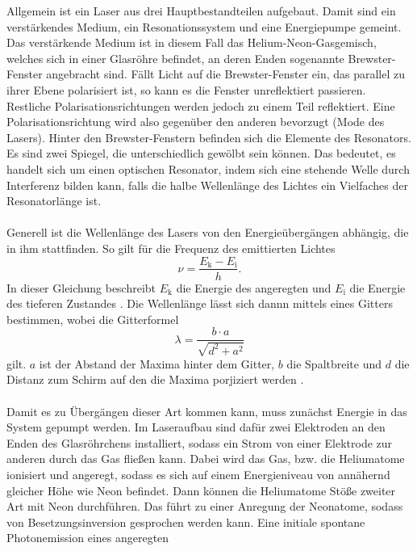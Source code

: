 Allgemein ist ein Laser aus drei Hauptbestandteilen aufgebaut. Damit sind ein 
verstärkendes Medium, ein Resonationssystem und eine Energiepumpe gemeint.
Das verstärkende Medium ist in diesem Fall das Helium-Neon-Gasgemisch, welches sich 
in einer Glasröhre befindet, an deren Enden sogenannte Brewster-Fenster angebracht sind.
Fällt Licht auf die Brewster-Fenster ein, das parallel zu ihrer Ebene polarisiert ist,
so kann es die Fenster unreflektiert passieren. Restliche Polarisationsrichtungen werden jedoch
zu einem Teil reflektiert. Eine Polarisationsrichtung wird also gegenüber den anderen 
bevorzugt (Mode des Lasers). Hinter den Brewster-Fenstern befinden sich die 
Elemente des Resonators. Es sind zwei Spiegel, die unterschiedlich gewölbt sein können.
Das bedeutet, es handelt sich um einen optischen Resonator, indem sich eine 
stehende Welle durch Interferenz bilden kann, falls die halbe Wellenlänge des Lichtes ein 
Vielfaches der Resonatorlänge ist.\\\\
Generell ist die Wellenlänge des Lasers von den Energieübergängen abhängig, die in ihm 
stattfinden. So gilt für die Frequenz des emittierten Lichtes 
\begin{equation}
    \nu = \frac{ E_{\text{k}} - E_{\text{i}} }{h}.
    \label{eq1}
\end{equation}
In dieser Gleichung beschreibt $E_{\text{k}}$ die Energie des angeregten 
und $E_{\text{i}}$ die Energie des tieferen Zustandes \cite{1}.
Die Wellenlänge lässt sich dannn mittels eines Gitters bestimmen, wobei die 
Gitterformel 
\begin{equation}
    \lambda = \frac{b \cdot a}{\sqrt{d^2+a^2}}
    \label{eq2}
\end{equation}
gilt. $a$ ist der Abstand der Maxima hinter dem Gitter, $b$ die Spaltbreite und 
$d$ die Distanz zum Schirm auf den die Maxima porjiziert werden \cite{2}.\\\\
Damit es zu Übergängen dieser Art kommen kann, muss zunächst Energie in das 
System gepumpt werden.
Im Laseraufbau sind dafür zwei Elektroden an den Enden des Glasröhrchens installiert, 
sodass ein Strom von einer Elektrode zur anderen durch das Gas fließen kann.
Dabei wird das Gas, bzw. die Heliumatome ionisiert und angeregt,
sodass es sich auf einem Energieniveau von annähernd gleicher Höhe wie Neon befindet.
Dann können die Heliumatome Stöße zweiter Art mit Neon durchführen.
Das führt zu einer Anregung der Neonatome, sodass von Besetzungsinversion 
gesprochen werden kann. Eine initiale spontane Photonemission eines angeregten 
